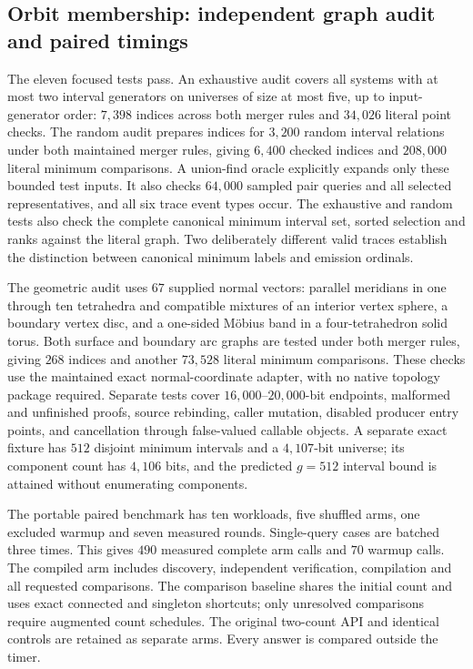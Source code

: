 \subsection{Orbit membership: independent graph audit and paired timings}

The eleven focused tests pass.  An exhaustive audit covers all systems with at most two interval generators
on universes of size at most five, up to input-generator order: $7{,}398$
indices across both merger rules and $34{,}026$ literal point checks.
The random audit prepares indices for $3{,}200$ random
interval relations under both maintained merger rules, giving $6{,}400$
checked indices and $208{,}000$ literal minimum comparisons.  A union-find
oracle explicitly expands only these bounded test inputs.  It also checks
$64{,}000$ sampled pair queries and all selected representatives, and all six
trace event types occur. The exhaustive and random tests also check the
complete canonical minimum interval set, sorted selection and ranks against
the literal graph. Two deliberately different valid traces establish
the distinction between canonical minimum labels and emission ordinals.

The geometric audit uses $67$ supplied normal vectors: parallel meridians
in one through ten tetrahedra and compatible mixtures of an interior
vertex sphere, a boundary vertex disc, and a one-sided M\"obius band in a
four-tetrahedron solid torus.  Both surface and boundary arc graphs are
tested under both merger rules, giving $268$ indices and another $73{,}528$
literal minimum comparisons.  These checks use the maintained exact
normal-coordinate adapter, with no native topology package required.
Separate tests cover $16{,}000$--$20{,}000$-bit endpoints, malformed and
unfinished proofs, source rebinding, caller mutation, disabled producer
entry points, and cancellation through false-valued callable objects.  A
separate exact fixture has $512$ disjoint minimum intervals and a $4{,}107$-bit
universe; its component count has $4{,}106$ bits, and the predicted $g=512$
interval bound is attained without enumerating components.

The portable paired benchmark has ten workloads, five shuffled arms,
one excluded warmup and seven measured rounds.  Single-query cases are
batched three times.  This gives $490$ measured complete arm calls and
$70$ warmup calls.  The compiled arm includes discovery, independent
verification, compilation and all requested comparisons.  The comparison
baseline shares the initial count and uses exact connected and singleton
shortcuts; only unresolved comparisons require augmented count schedules.
The original two-count API and identical controls are retained as separate
arms.  Every answer is compared outside the timer.

